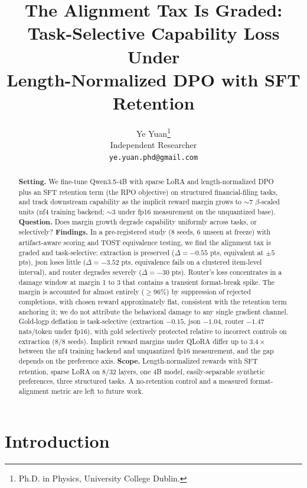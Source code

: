 \documentclass{article}
\title{The Alignment Tax Is Graded:\\
Task-Selective Capability Loss Under\\
Length-Normalized DPO with SFT Retention}
\author{%
  Ye Yuan\thanks{Ph.D. in Physics, University College Dublin.}\\
  Independent Researcher\\
  \texttt{ye.yuan.phd@gmail.com}%
}
\begin{document}
\maketitle

\begin{abstract}
\textbf{Setting.} We fine-tune Qwen3.5-4B with sparse LoRA and length-normalized DPO plus an SFT retention term (the RPO objective) on structured financial-filing tasks, and track downstream capability as the implicit reward margin grows to ${\sim}7$ $\beta$-scaled units (nf4 training backend; ${\sim}3$ under fp16 measurement on the unquantized base). \textbf{Question.} Does margin growth degrade capability uniformly across tasks, or selectively? \textbf{Findings.} In a pre-registered study (8 seeds, 6 unseen at freeze) with artifact-aware scoring and TOST equivalence testing, we find the alignment tax is graded and task-selective: extraction is preserved ($\Delta = -0.55$ pts, equivalent at $\pm5$ pts), json loses little ($\Delta = -3.52$ pts, equivalence fails on a clustered item-level interval), and router degrades severely ($\Delta = -30$ pts). Router's loss concentrates in a damage window at margin 1 to 3 that contains a transient format-break spike. The margin is accounted for almost entirely (${\geq}96\%$) by suppression of rejected completions, with chosen reward approximately flat, consistent with the retention term anchoring it; we do not attribute the behavioral damage to any single gradient channel. Gold-logp deflation is task-selective (extraction $-0.15$, json $-1.04$, router $-1.47$ nats/token under fp16), with gold selectively protected relative to incorrect controls on extraction (8/8 seeds). Implicit reward margins under QLoRA differ up to $3.4\times$ between the nf4 training backend and unquantized fp16 measurement, and the gap depends on the preference axis. \textbf{Scope.} Length-normalized rewards with SFT retention, sparse LoRA on 8/32 layers, one 4B model, easily-separable synthetic preferences, three structured tasks. A no-retention control and a measured format-alignment metric are left to future work.
\end{abstract}

\section{Introduction}
\end{document}
